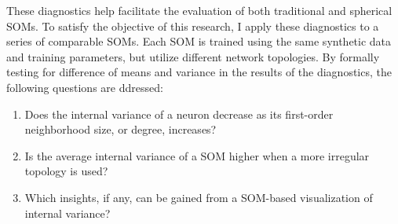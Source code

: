 These diagnostics help facilitate the evaluation of both traditional and
spherical SOMs.  To satisfy the objective of this research, I apply these
diagnostics to a series of comparable SOMs.  Each SOM is trained using the
same synthetic data and training parameters, but utilize different network
topologies.  By formally testing for difference of means and variance in the
results of the diagnostics, the following questions are ddressed:

\begin{enumerate}
	\item Does the internal variance of a neuron decrease as its first-order neighborhood size, or degree, increases?
	\item Is the average internal variance of a SOM higher when a more irregular topology is used?
	\item Which insights, if any, can be gained from a SOM-based visualization of internal variance?
\end{enumerate}
